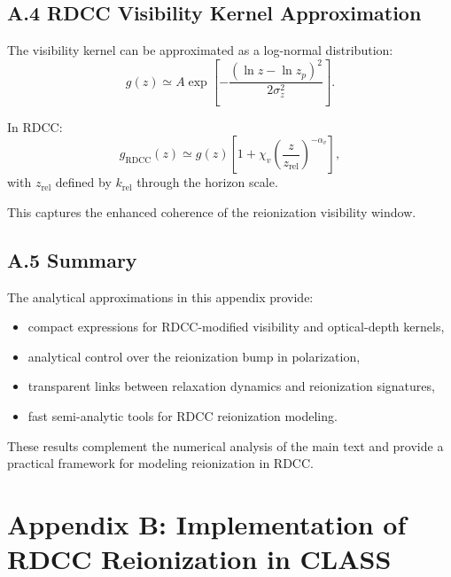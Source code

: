 \documentclass[11pt,a4paper]{article}
\begin{document}
\subsection*{A.4 RDCC Visibility Kernel Approximation}

The visibility kernel can be approximated as a log-normal distribution:
\begin{equation}
g(z)
\simeq
A
\exp\!\left[
-\frac{(\ln z - \ln z_{p})^{2}}{2\sigma_{z}^{2}}
\right].
\end{equation}

In RDCC:
\begin{equation}
g_{\mathrm{RDCC}}(z)
\simeq
g(z)
\left[
1
+
\chi_{v}
\left(
\frac{z}{z_{\mathrm{rel}}}
\right)^{-\alpha_{v}}
\right],
\end{equation}
with $z_{\mathrm{rel}}$ defined by $k_{\mathrm{rel}}$ through the horizon scale.

This captures the enhanced coherence of the reionization visibility window.

\subsection*{A.5 Summary}

The analytical approximations in this appendix provide:
\begin{itemize}
\item compact expressions for RDCC-modified visibility and optical-depth kernels,
\item analytical control over the reionization bump in polarization,
\item transparent links between relaxation dynamics and reionization signatures,
\item fast semi-analytic tools for RDCC reionization modeling.
\end{itemize}

These results complement the numerical analysis of the main text and provide a practical
framework for modeling reionization in RDCC.

\section*{Appendix B: Implementation of RDCC Reionization in CLASS}
\end{document}
